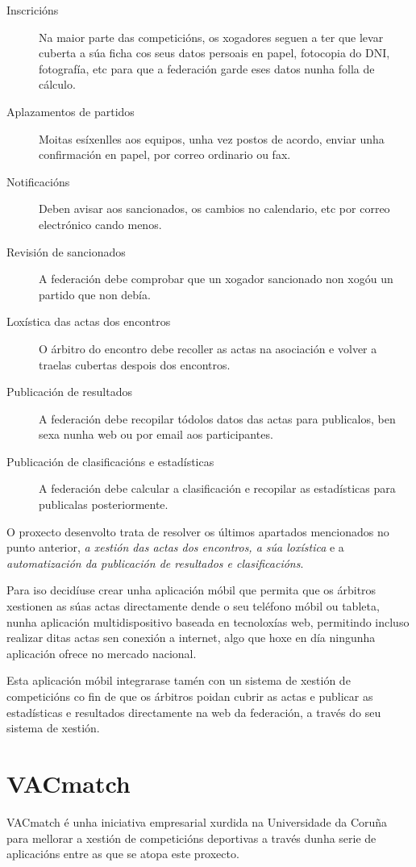     \begin{description}
     \item [Inscricións] Na maior parte das competicións, os xogadores seguen a ter que 
levar cuberta a súa ficha cos seus datos persoais en papel, fotocopia do DNI, fotografía, 
etc para que a federación garde eses datos nunha folla de cálculo.
     \item [Aplazamentos de partidos] Moitas esíxenlles aos equipos, unha vez postos de 
acordo, enviar unha confirmación en papel, por correo ordinario ou fax.
     \item [Notificacións] Deben avisar aos sancionados, os cambios no calendario, etc 
por correo electrónico cando menos.
     \item [Revisión de sancionados] A federación debe comprobar que un xogador 
sancionado non xogóu un partido que non debía.
     \item [Loxística das actas dos encontros] O árbitro do encontro debe recoller as 
actas na asociación e volver a traelas cubertas despois dos encontros.
     \item [Publicación de resultados] A federación debe recopilar tódolos datos das 
actas para publicalos, ben sexa nunha web ou por email aos participantes.
     \item [Publicación de clasificacións e estadísticas] A federación debe calcular a 
clasificación e recopilar as estadísticas para publicalas posteriormente.
    \end{description}

    O proxecto desenvolto trata de resolver os últimos apartados mencionados no 
punto anterior, \emph{a xestión das actas dos encontros, a súa loxística} e a 
\emph{automatización da publicación de resultados e clasificacións}.

  Para iso decidíuse crear unha aplicación móbil que permita que os árbitros 
xestionen as súas actas directamente dende o seu teléfono móbil ou tableta, 
nunha aplicación multidispositivo baseada en tecnoloxías web, permitindo incluso realizar 
ditas actas sen conexión a internet, algo que hoxe en día ningunha aplicación ofrece no 
mercado nacional.

  Esta aplicación móbil integrarase tamén con un sistema de xestión de 
competicións co fin de que os árbitros poidan cubrir as actas e publicar as 
estadísticas e resultados directamente na web da federación, a través do seu 
sistema de xestión.

    \section{VACmatch}
    VACmatch é unha iniciativa empresarial xurdida na Universidade da Coruña para 
mellorar a xestión de competicións deportivas a través dunha serie de 
aplicacións entre as que se atopa este proxecto.

